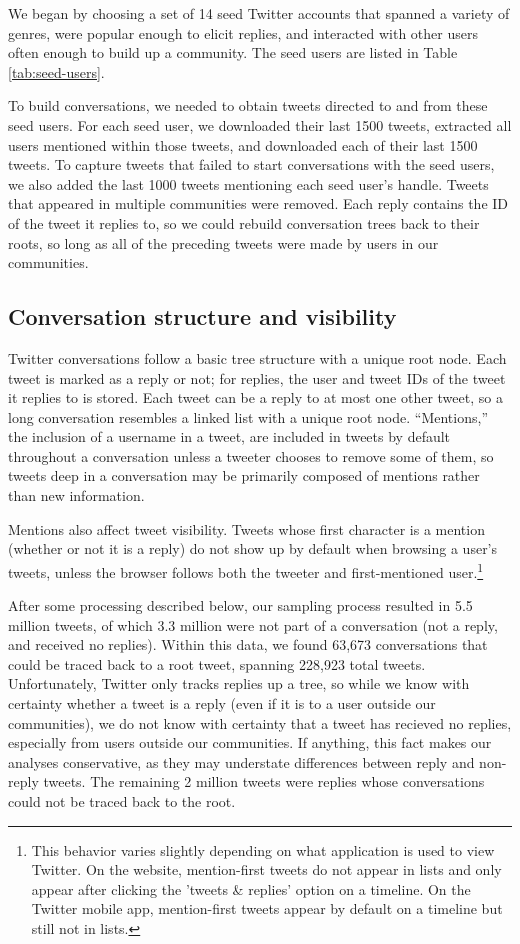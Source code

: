 \documentclass[11pt,letterpaper]{article}
\begin{document}
We began by choosing a set of 14 seed Twitter accounts that spanned a variety of genres, were popular enough to elicit replies, and interacted with other users often enough to build up a community.  The seed users are listed in Table \ref{tab:seed-users}.  

To build conversations, we needed to obtain tweets directed to and from these seed users. For each seed user, we downloaded their last 1500 tweets, extracted all users mentioned within those tweets, and downloaded each of their last 1500 tweets.  To capture tweets that failed to start conversations with the seed users, we also added the last 1000 tweets mentioning each seed user's handle.  Tweets that appeared in multiple communities were removed.  Each reply contains the ID of the tweet it replies to, so we could rebuild conversation trees back to their roots, so long as all of the preceding tweets were made by users in our communities.

\subsection{Conversation structure and visibility}\label{sect:conversation}

Twitter conversations follow a basic tree structure with a unique root node. Each tweet is marked as a reply or not; for replies, the user and tweet IDs of the tweet it replies to is stored. Each tweet can be a reply to at most one other tweet, so a long conversation resembles a linked list with a unique root node. ``Mentions,'' the inclusion of a username in a tweet, are included in tweets by default throughout a conversation unless a tweeter chooses to remove some of them, so tweets deep in a conversation may be primarily composed of mentions rather than new information.  

Mentions also affect tweet visibility.  Tweets whose first character is a mention (whether or not it is a reply) do not show up by default when browsing a user's tweets, unless the browser follows both the tweeter and first-mentioned user.\footnote{This behavior varies slightly depending on what application is used to view Twitter.  On the website, mention-first tweets do not appear in lists and only appear after clicking the 'tweets \& replies' option on a timeline. On the Twitter mobile app, mention-first tweets appear by default on a timeline but still not in lists.}

After some processing described below, our sampling process resulted in 5.5 million tweets, of which 3.3 million were not part of a conversation (not a reply, and received no replies).  Within this data, we found 63,673 conversations that could be traced back to a root tweet, spanning 228,923 total tweets. Unfortunately, Twitter only tracks replies up a tree, so while we know with certainty whether a tweet is a reply (even if it is to a user outside our communities), we do not know with certainty that a tweet has recieved no replies, especially from users outside our communities. If anything, this fact makes our analyses conservative, as they may understate differences between reply and non-reply tweets. The remaining 2 million tweets were replies whose conversations could not be traced back to the root.
\end{document}
